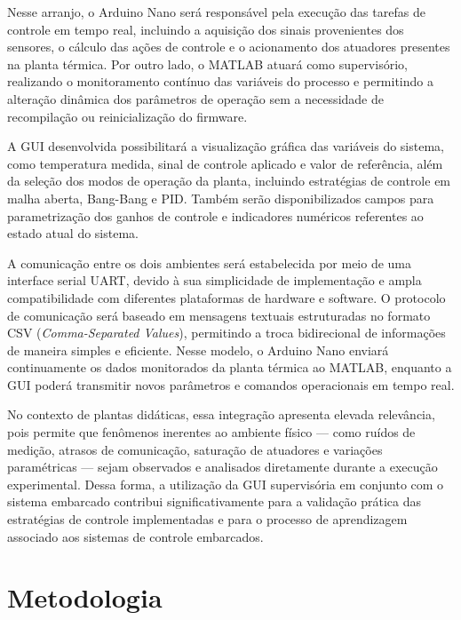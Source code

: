 \documentclass[repeatfields,xlists,xpacks,oneside]{ufrgscca}
\begin{document}
Nesse arranjo, o Arduino Nano será responsável pela execução das tarefas de controle
em tempo real, incluindo a aquisição dos sinais provenientes dos sensores, o cálculo das
ações de controle e o acionamento dos atuadores presentes na planta térmica. Por outro
lado, o MATLAB atuará como supervisório, realizando o monitoramento contínuo das
variáveis do processo e permitindo a alteração dinâmica dos parâmetros de operação sem
a necessidade de recompilação ou reinicialização do firmware.

A GUI desenvolvida possibilitará a visualização gráfica das variáveis do sistema, como
temperatura medida, sinal de controle aplicado e valor de referência, além da seleção dos
modos de operação da planta, incluindo estratégias de controle em malha aberta,
Bang-Bang e PID\@. Também serão disponibilizados campos para parametrização dos ganhos
de controle e indicadores numéricos referentes ao estado atual do sistema.

A comunicação entre os dois ambientes será estabelecida por meio de uma interface
serial UART, devido à sua simplicidade de implementação e ampla compatibilidade com
diferentes plataformas de hardware e software. O protocolo de
comunicação será baseado em mensagens textuais estruturadas no formato CSV
(\textit{Comma-Separated Values}), permitindo a troca bidirecional de informações de maneira
simples e eficiente. Nesse modelo, o Arduino Nano enviará continuamente os dados
monitorados da planta térmica ao MATLAB, enquanto a GUI poderá transmitir novos
parâmetros e comandos operacionais em tempo real.

No contexto de plantas didáticas, essa integração apresenta elevada relevância, pois
permite que fenômenos inerentes ao ambiente físico --- como ruídos de medição, atrasos
de comunicação, saturação de atuadores e variações paramétricas --- sejam observados e
analisados diretamente durante a execução experimental. Dessa forma, a utilização da GUI
supervisória em conjunto com o sistema embarcado contribui significativamente para a
validação prática das estratégias de controle implementadas e para o processo de
aprendizagem associado aos sistemas de controle embarcados.


\chapter{Metodologia}
\label{cap:metodologia}
\end{document}
